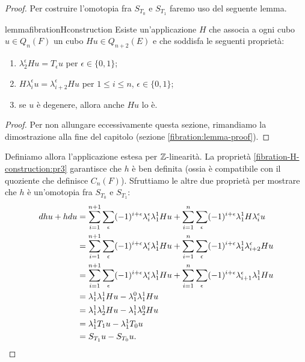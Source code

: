 \begin{proof}
Per costruire l'omotopia fra \(S_{T_0}\) e \(S_{T_1}\) faremo uso del seguente lemma.
\begin{restatable}{lemma}{fibrationHconstruction}\label{fibration-H-construction}
Esiste un'applicazione \(H\) che associa a ogni cubo \(u\in Q_n(F)\) un cubo \(Hu\in Q_{n+2}(E)\) e che soddisfa le seguenti proprietà:
\begin{enumerate}
\item\label{fibration-H-construction:pr1} \(\lambda^\epsilon_2Hu=T_\epsilon u\) per \(\epsilon\in\{0,1\}\);
\item\label{fibration-H-construction:pr2} \(H\lambda^\epsilon_iu=\lambda^\epsilon_{i+2}Hu\) per \(1\le i\le n\), \(\epsilon\in\{0,1\}\);
\item\label{fibration-H-construction:pr3} se \(u\) è degenere, allora anche \(Hu\) lo è.
\end{enumerate}
\end{restatable}
\begin{proof}
Per non allungare eccessivamente questa sezione, rimandiamo la dimostrazione alla fine del capitolo (sezione \ref{fibration:lemma-proof}).
\end{proof}
Definiamo allora l'applicazione
estesa per \(\mathbb{Z}\)-linearità. La proprietà \ref{fibration-H-construction:pr3} garantisce che \(h\) è ben definita (ossia è compatibile con il quoziente che definisce \(C_n(F)\)). Sfruttiamo le altre due proprietà per mostrare che \(h\) è un'omotopia fra \(S_{T_0}\) e \(S_{T_1}\):
\begin{align*}
dhu+hdu&=\sum_{i=1}^{n+1}\sum_\epsilon(-1)^{i+\epsilon}\lambda^\epsilon_i\lambda^1_1Hu+\sum_{i=1}^n\sum_\epsilon(-1)^{i+\epsilon}\lambda^1_1H\lambda^\epsilon_iu\\
&=\sum_{i=1}^{n+1}\sum_\epsilon(-1)^{i+\epsilon}\lambda^\epsilon_i\lambda^1_1Hu+\sum_{i=1}^n\sum_\epsilon(-1)^{i+\epsilon}\lambda^1_1\lambda^\epsilon_{i+2}Hu\\
&=\sum_{i=1}^{n+1}\sum_\epsilon(-1)^{i+\epsilon}\lambda^\epsilon_i\lambda^1_1Hu+\sum_{i=1}^n\sum_\epsilon(-1)^{i+\epsilon}\lambda^\epsilon_{i+1}\lambda^1_1Hu\\
&=\lambda^1_1\lambda^1_1Hu-\lambda^0_1\lambda^1_1Hu\\
&=\lambda^1_1\lambda^1_2Hu-\lambda^1_1\lambda^0_2Hu\\
&=\lambda^1_1T_1u-\lambda^1_1T_0u\\
&=S_{T_1}u-S_{T_0}u.\qedhere
\end{align*}
\end{proof}
